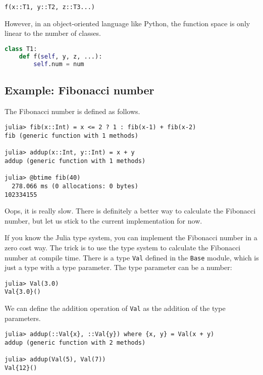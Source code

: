 \documentclass[
  notoc %
]{tufte-book}
\newcommand{\passthrough}[1]{#1}
\begin{document}
\begin{lstlisting}
f(x::T1, y::T2, z::T3...)
\end{lstlisting}

However, in an object-oriented language like Python, the function space
is only linear to the number of classes.

\begin{lstlisting}[language=Python]
class T1:
    def f(self, y, z, ...):
        self.num = num
\end{lstlisting}

\hypertarget{example-fibonacci-number}{%
\subsection{Example: Fibonacci number}\label{example-fibonacci-number}}

The Fibonacci number is defined as follows.

\begin{lstlisting}
julia> fib(x::Int) = x <= 2 ? 1 : fib(x-1) + fib(x-2)
fib (generic function with 1 methods)

julia> addup(x::Int, y::Int) = x + y
addup (generic function with 1 methods)

julia> @btime fib(40)
  278.066 ms (0 allocations: 0 bytes)
102334155
\end{lstlisting}

Oops, it is really slow. There is definitely a better way to calculate
the Fibonacci number, but let us stick to the current implementation for
now.

If you know the Julia type system, you can implement the Fibonacci
number in a zero cost way. The trick is to use the type system to
calculate the Fibonacci number at compile time. There is a type
\passthrough{\lstinline!Val!} defined in the
\passthrough{\lstinline!Base!} module, which is just a type with a type
parameter. The type parameter can be a number:

\begin{lstlisting}
julia> Val(3.0)
Val{3.0}()
\end{lstlisting}

We can define the addition operation of \passthrough{\lstinline!Val!} as
the addition of the type parameters.

\begin{lstlisting}
julia> addup(::Val{x}, ::Val{y}) where {x, y} = Val(x + y)
addup (generic function with 2 methods)

julia> addup(Val(5), Val(7))
Val{12}()
\end{lstlisting}
\end{document}
